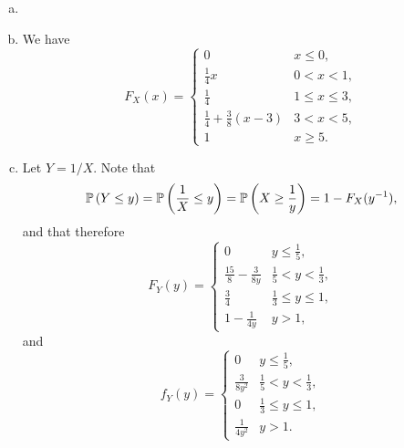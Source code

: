 \begin{ex}
  \begin{enumerate}[(a)]
    \item []
    \item We have
          \[
            F_X(x)=\begin{cases}
              0                                & x \leq 0,        \\
              \frac{1}{4}x                     & 0 < x < 1,       \\
              \frac{1}{4}                      & 1 \leq x \leq 3, \\
              \frac{1}{4} + \frac{3}{8}(x - 3) & 3 < x < 5,       \\
              1                                & x \geq 5.
            \end{cases}
          \]
    \item Let $Y=1/X$. Note that
          \[
            \P{Y\leq y}
            =\P{\frac{1}{X}\leq y}
            =\P{X\geq \frac{1}{y}}
            =1-F_X(y^{-1}),
          \]
          and that therefore
          \[
            F_Y(y)=\begin{cases}
              0                         & y\leq\frac{1}{5},          \\
              \frac{15}{8}-\frac{3}{8y} & \frac{1}{5}<y<\frac{1}{3}, \\
              \frac{3}{4}               & \frac{1}{3}\leq y\leq 1,   \\
              1 - \frac{1}{4y}          & y>1,
            \end{cases}
          \]
          and
          \[
            f_Y(y)=\begin{cases}
              0              & y\leq\frac{1}{5},          \\
              \frac{3}{8y^2} & \frac{1}{5}<y<\frac{1}{3}, \\
              0              & \frac{1}{3}\leq y\leq 1,   \\
              \frac{1}{4y^2} & y>1.
            \end{cases}
          \]
  \end{enumerate}
\end{ex}

